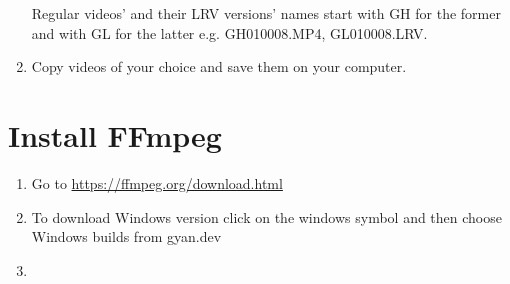\documentclass[a4paper,12pt]{book}
\begin{document}
\begin{enumerate}
	Regular videos’ and their LRV versions’ names start with GH for the former and with GL for the latter e.g. GH010008.MP4, GL010008.LRV. \\
	\item Copy videos of your choice and save them on your computer.
\end{enumerate}

\chapter{Install FFmpeg}
\begin{enumerate}
	\item Go to \url{https://ffmpeg.org/download.html}
	\item \begin{minipage}[t]{\linewidth}
		\raggedright
		\medskip	
	\end{minipage}
	To download Windows version click on the windows symbol and then choose Windows builds from gyan.dev
	\item \begin{minipage}[t]{\linewidth}
		\raggedright
		\medskip	
	\end{minipage}

\end{enumerate}
\end{document}
